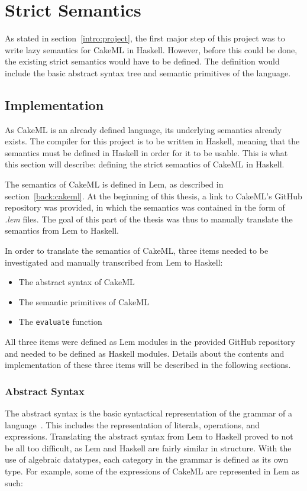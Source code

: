 \chapter{Strict Semantics}
\label{chapter:strict}
As stated in section~\ref{intro:project}, the first major step of this project
was to write lazy semantics for CakeML in Haskell. However, before this could be
done, the existing strict semantics would have to be defined. The definition
would include the basic abstract syntax tree and semantic primitives of the
language.

\section{Implementation}
As CakeML is an already defined language, its underlying semantics already
exists. The compiler for this project is to be written in Haskell, meaning that
the semantics must be defined in Haskell in order for it to be usable. This is
what this section will describe: defining the strict semantics of CakeML in
Haskell.

The semantics of CakeML is defined in Lem, as described in
section~\ref{back:cakeml}. At the beginning of this thesis, a link to CakeML's
GitHub repository was provided, in which the semantics was contained in the form
of \textit{.lem} files. The goal of this part of the thesis was thus to manually
translate the semantics from Lem to Haskell. 

In order to translate the semantics of CakeML, three items needed to be
investigated and manually transcribed from Lem to Haskell:
\begin{itemize}
\item The abstract syntax of CakeML
\item The semantic primitives of CakeML
\item The \texttt{evaluate} function
\end{itemize}

\noindent All three items were defined as Lem modules in the provided GitHub
repository and needed to be defined as Haskell modules.
Details about the contents and implementation of these three items
will be described in the following sections.

\subsection{Abstract Syntax}
\label{strict:abs}
The abstract syntax is the basic syntactical representation of the grammar of a
language~\cite{pltbook}. This includes the representation of literals,
operations, and expressions. Translating the abstract syntax from Lem to Haskell
proved to not be all too difficult, as Lem and Haskell are fairly similar in
structure. With the use of algebraic datatypes, each category in the grammar is
defined as its own type. For example, some of the expressions of CakeML
are represented in Lem as such:

